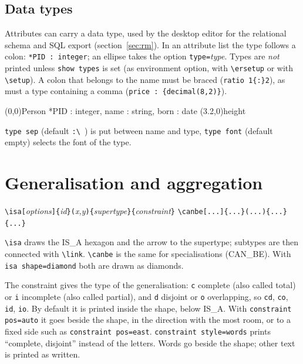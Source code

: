 \documentclass[10pt,a4paper]{article}
\newcommand\cs[1]{\texttt{\textbackslash#1}}
\newcommand\meta[1]{\textlangle\textit{#1}\textrangle}
\begin{document}
\subsection{Data types}\label{sec:types}

Attributes can carry a data type, used by the desktop editor for the
relational schema and SQL export (section~\ref{sec:rm}). In an attribute
list the type follows a colon: \verb|*PID : integer|; an ellipse takes the
option \texttt{type=}\meta{type}. Types are \emph{not} printed unless
\texttt{show types} is set (as environment option, with \cs{ersetup} or
with \cs{setup}). A colon that belongs to the name must be braced
(\verb|ratio 1{:}2|), as must a type containing a comma
(\verb|price : {decimal(8,2)}|).

\begin{example}
\begin{erdiagram}
  (0,0){Person}
    {*PID : integer, name : string,
     born : date}
  (3.2,0){height}
\end{erdiagram}
\end{example}

\texttt{type sep} (default \verb*|:\ |) is put between name and type,
\texttt{type font} (default empty) selects the font of the type.

\section{Generalisation and aggregation}\label{sec:generalisation}

\begin{center}
\verb|\isa[|\meta{options}\verb|]{|\meta{id}\verb|}(|\meta{x,y}\verb|){|\meta{supertype}\verb|}{|\meta{constraint}\verb|}|\qquad
\verb|\canbe[...]{...}(...){...}{...}|
\end{center}

\cs{isa} draws the IS\_A hexagon and the arrow to the supertype;
subtypes are then connected with \cs{link}. \cs{canbe} is the same for
specialisations (CAN\_BE). With \texttt{isa shape=diamond} both are drawn as diamonds.

The constraint gives the type of the generalisation: \texttt{c} complete (also called
total) or \texttt{i} incomplete (also called partial), and \texttt{d} disjoint or
\texttt{o} overlapping, so \texttt{cd}, \texttt{co}, \texttt{id}, \texttt{io}. By
default it is printed inside the shape, below IS\_A. With
\texttt{constraint pos=auto} it goes beside the shape, in the direction
with the most room, or to a fixed side such as
\texttt{constraint pos=east}. \texttt{constraint style=words} prints
``complete, disjoint'' instead of the letters. Words go beside the shape; other
text is printed as written.
\end{document}
